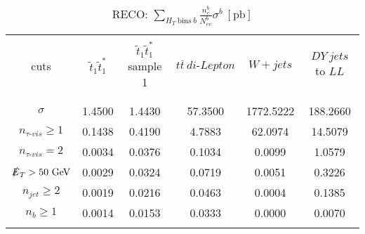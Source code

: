 \documentclass[12pt, a4paper]{article}
\begin{document}
\begin{table}[!ht]
\begin{center}
\begin{tabular}{| c | c | c | c | c | c |}
\hline
&&&&& \\
cuts & $ \tilde{t}_{1} \tilde{t}^{*}_{1} $ & $ \tilde{t}_{1} \tilde{t}^{*}_{1} $ sample 1 & $ t \bar{t} \  di \text{-} Lepton $ & $ W + jets $ & $ DY \ jets $ to $ LL $ \\
&&&&& \\
\hline
&&&&& \\
$ \sigma $ & 1.4500 & 1.4430 & 57.3500 & 1772.5222 & 188.2660 \\
$ n_{\tau \text{-} vis} \geqslant 1 $ & 0.1438 & 0.4190 & 4.7883 & 62.0974 & 14.5079 \\
$ n_{\tau \text{-} vis} = 2 $ & 0.0034 & 0.0376 & 0.1034 & 0.0099 & 1.0579 \\
$ \slashed{E}_T > 50 \ \text{GeV} $ & 0.0029 & 0.0324 & 0.0719 & 0.0051 & 0.3226 \\
$ n_{jet} \geqslant 2 $ & 0.0019 & 0.0216 & 0.0463 & 0.0004 & 0.1385 \\
$ n_{b} \geqslant 1 $ & 0.0014 & 0.0153 & 0.0333 & 0.0000 & 0.0070 \\
&&&&& \\
\hline
\end{tabular}
\end{center}
\caption{RECO: $ \sum\limits_{H_{T} \ \text{bins} \ b} \frac{n^{b}_{c}}{N^{b}_{ev}} \sigma^{b} \ [\text{pb}] $}
\label{}
\end{table}
\end{document}
